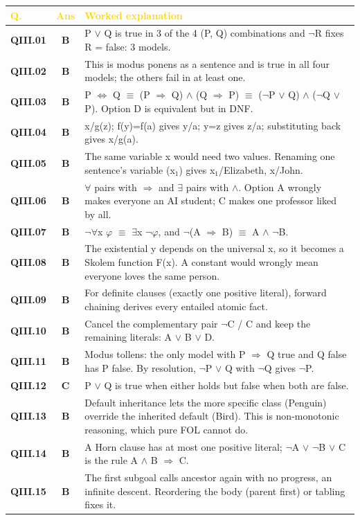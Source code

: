 \begin{longtable}{>{\leavevmode\bfseries\color{navy}}p{1.3cm} c p{13.2cm}}
\rowcolor{navy}\textcolor{gold}{\textbf{Q.}}&\textcolor{gold}{\textbf{Ans}}&\textcolor{gold}{\textbf{Worked explanation}}\\\endhead
QIII.01&\textbf{\color{leaf}B}&P $\vee$ Q is true in 3 of the 4 (P, Q) combinations and $\neg$R fixes R = false: 3 models.\\
\rowcolor{ivory}QIII.02&\textbf{\color{leaf}B}&This is modus ponens as a sentence and is true in all four models; the others fail in at least one.\\
QIII.03&\textbf{\color{leaf}B}&P $\Leftrightarrow$ Q $\equiv$ (P $\Rightarrow$ Q) $\wedge$ (Q $\Rightarrow$ P) $\equiv$ ($\neg$P $\vee$ Q) $\wedge$ ($\neg$Q $\vee$ P). Option D is equivalent but in DNF.\\
\rowcolor{ivory}QIII.04&\textbf{\color{leaf}B}&x/g(z); f(y)=f(a) gives y/a; y=z gives z/a; substituting back gives x/g(a).\\
QIII.05&\textbf{\color{leaf}B}&The same variable x would need two values. Renaming one sentence's variable (x$_1$) gives {x$_1$/Elizabeth, x/John}.\\
\rowcolor{ivory}QIII.06&\textbf{\color{leaf}B}&$\forall$ pairs with $\Rightarrow$ and $\exists$ pairs with $\wedge$. Option A wrongly makes everyone an AI student; C makes one professor liked by all.\\
QIII.07&\textbf{\color{leaf}B}&$\neg$$\forall$x $\varphi$ $\equiv$ $\exists$x $\neg$$\varphi$, and $\neg$(A $\Rightarrow$ B) $\equiv$ A $\wedge$ $\neg$B.\\
\rowcolor{ivory}QIII.08&\textbf{\color{leaf}B}&The existential y depends on the universal x, so it becomes a Skolem function F(x). A constant would wrongly mean everyone loves the same person.\\
QIII.09&\textbf{\color{leaf}B}&For definite clauses (exactly one positive literal), forward chaining derives every entailed atomic fact.\\
\rowcolor{ivory}QIII.10&\textbf{\color{leaf}B}&Cancel the complementary pair $\neg$C / C and keep the remaining literals: A $\vee$ B $\vee$ D.\\
QIII.11&\textbf{\color{leaf}B}&Modus tollens: the only model with P $\Rightarrow$ Q true and Q false has P false. By resolution, $\neg$P $\vee$ Q with $\neg$Q gives $\neg$P.\\
\rowcolor{ivory}QIII.12&\textbf{\color{leaf}C}&P $\vee$ Q is true when either holds but false when both are false.\\
QIII.13&\textbf{\color{leaf}B}&Default inheritance lets the more specific class (Penguin) override the inherited default (Bird). This is non-monotonic reasoning, which pure FOL cannot do.\\
\rowcolor{ivory}QIII.14&\textbf{\color{leaf}B}&A Horn clause has at most one positive literal; $\neg$A $\vee$ $\neg$B $\vee$ C is the rule A $\wedge$ B $\Rightarrow$ C.\\
QIII.15&\textbf{\color{leaf}B}&The first subgoal calls ancestor again with no progress, an infinite descent. Reordering the body (parent first) or tabling fixes it.\\
\end{longtable}